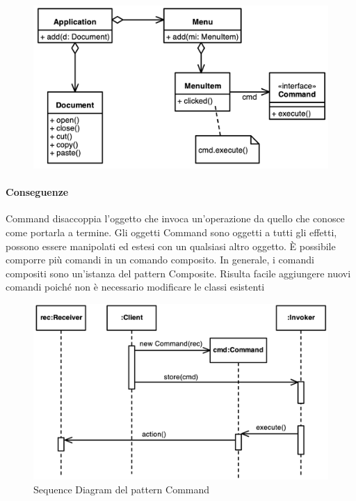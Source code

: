 \begin{figure}[H]
    \centering
    \includegraphics[width=1\linewidth]{assets/pattern/command/command-esempio.png}
\end{figure}

\paragraph{Conseguenze} Command disaccoppia l’oggetto che invoca un’operazione da quello che conosce come portarla a termine. 
Gli oggetti Command sono oggetti a tutti gli effetti, possono essere manipolati ed estesi con un qualsiasi altro oggetto. 
È possibile comporre più comandi in un comando composito.
In generale, i comandi compositi sono un’istanza del pattern Composite.
Risulta facile aggiungere nuovi comandi poiché non è necessario modificare le classi esistenti

\begin{figure}[H]
    \centering
    \includegraphics[width=1\linewidth]{assets/pattern/command/command-sequence.png}
    \caption{Sequence Diagram del pattern Command}
\end{figure}



\newpage